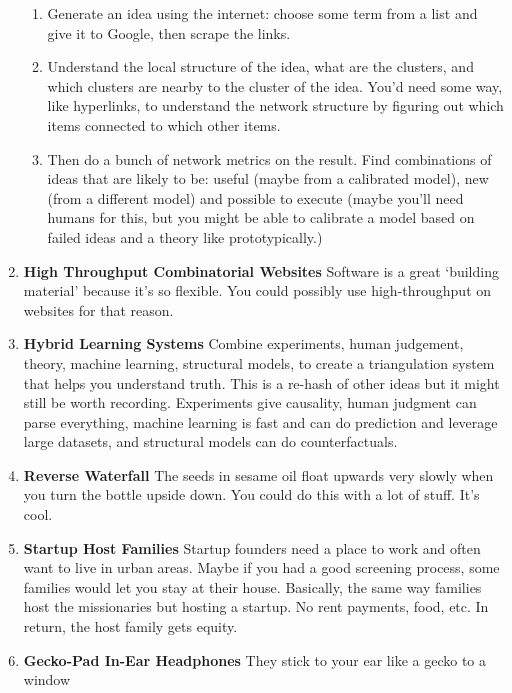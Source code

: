 \documentclass[paper=a4, fontsize=11pt]{scrartcl} %
\numberwithin{equation}{section} %
\numberwithin{figure}{section} %
\numberwithin{table}{section} %
\begin{document}
\begin{enumerate}
\begin{enumerate}
\item Generate an idea using the internet: choose some term from a list and give it to Google, then scrape the links.
\item Understand the local structure of the idea, what are the clusters, and which clusters are nearby to the cluster of the idea.  You'd need some way, like hyperlinks, to understand the network structure by figuring out which items connected to which other items.  
\item Then do a bunch of network metrics on the result.  Find combinations of ideas that are likely to be: useful (maybe from a calibrated model), new (from a different model) and possible to execute (maybe you'll need humans for this, but you might be able to calibrate a model based on failed ideas and a theory like prototypically.)
\end{enumerate}

\item \textbf{High Throughput Combinatorial Websites} Software is a great `building material' because it's so flexible.  You could possibly use high-throughput on websites for that reason.

\item \textbf{Hybrid Learning Systems} Combine experiments, human judgement, theory, machine learning, structural models, to create a triangulation system that helps you understand truth.  This is a re-hash of other ideas but it might still be worth recording.  Experiments give causality, human judgment can parse everything, machine learning is fast and can do prediction and leverage large datasets, and structural models can do counterfactuals.

\item \textbf{Reverse Waterfall} The seeds in sesame oil float upwards very slowly when you turn the bottle upside down.  You could do this with a lot of stuff.  It's cool.  

\item \textbf{Startup Host Families}  Startup founders need a place to work and often want to live in urban areas.  Maybe if you had a good screening process, some families
would let you stay at their house.  Basically, the same way families host the missionaries but hosting a startup.  No rent payments, food, etc.  In return, the host family gets equity.

\item \textbf{Gecko-Pad In-Ear Headphones} They stick to your ear like a gecko to a window


\end{enumerate}
\end{document}

